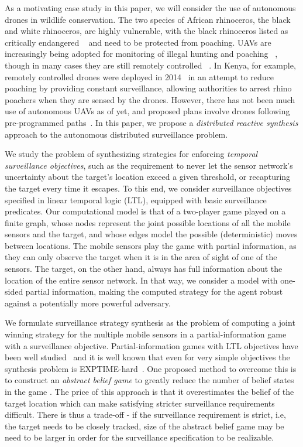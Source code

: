 As a motivating case study in this paper, we will consider the use of autonomous drones in wildlife conservation. The two species of African rhinoceros, the black and white rhinoceros, are highly vulnerable, with the black rhinoceros listed as critically endangered ~\cite{mulero2014remotely} and need to be protected from poaching. UAVs are increasingly being adopted for monitoring of illegal hunting and poaching ~\cite{schiffman2014drones}, though in many cases they are still remotely controlled ~\cite{mulero2014remotely}. In Kenya, for example, remotely controlled drones were deployed in 2014~\cite{Kenya} in an attempt to reduce poaching  by providing constant surveillance, allowing authorities to arrest rhino poachers when they are sensed by the drones. However, there has not been much use of autonomous UAVs as of yet, and proposed plans involve drones following pre-programmed paths~\cite{Koh12}. In this paper, we propose a \emph{distributed reactive synthesis} approach to the autonomous distributed surveillance problem. 

We study the problem of synthesizing strategies for enforcing \emph{temporal surveillance objectives}, such as the requirement to never let the sensor network's uncertainty about the target's location exceed a given threshold, or recapturing the target every time it escapes. To this end, we consider surveillance objectives specified in linear temporal logic (LTL), equipped with basic surveillance predicates. Our computational model is that of a two-player game played on a finite graph, whose nodes represent the joint possible locations of all the mobile sensors and the target, and whose edges model the possible (deterministic) moves between locations. The mobile sensors play the game with partial information, as they can only observe the target when  it is in the area of sight of one of the sensors. The target, on the other hand, always has full information about the location of the entire sensor network. In that way, we consider a model with one-sided partial information, making the computed strategy for the agent robust against a potentially more powerful adversary. 

We formulate surveillance strategy synthesis as the problem of computing a joint winning strategy for the multiple mobile sensors in a partial-information game with a surveillance objective. Partial-information games with LTL objectives have been well studied~\cite{DoyenR11,Chatterjee2013} and it is well known that even for very simple objectives the synthesis problem is EXPTIME-hard~\cite{Reif84,BerwangerD08}. One proposed method to overcome this is to construct an \emph{abstract belief game} to greatly reduce the number of belief states in the game \cite{Bhar16}. The price of this approach is that it overestimates the belief of the target location which can make satisfying stricter surveillance requirements difficult. There is thus a trade-off - if the surveillance requirement is strict, i.e, the target needs to be closely tracked, size of the abstract belief game may be need to be larger in order for the surveillance specification to be realizable. 

